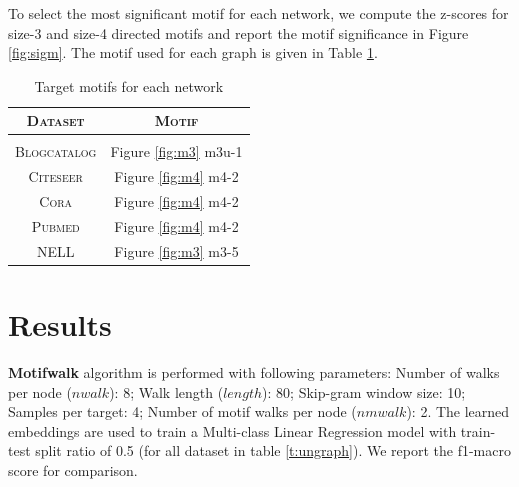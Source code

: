 \documentclass{article}
\theoremstyle{definition}
\begin{document}
\begin{table}
\centering
{}
\setlength{\belowcaptionskip}{-10pt}
\caption{Datasets for semi-supervised embeddings}
\label{t:segraph}
\end{table}
To select the most significant motif for each network, we compute the z-scores for
size-3 and size-4 directed motifs and report the motif significance
in Figure \ref{fig:sigm}. The motif used for each graph is given in Table
\ref{t:motifs}. 
\begin{table}
\centering
\begin{tabular}{c c}
\textsc{Dataset} & \textsc{Motif} \\
\hline \\
\textsc{Blogcatalog} & Figure \ref{fig:m3} m3u-1 \\
\textsc{Citeseer} & Figure \ref{fig:m4} m4-2 \\
\textsc{Cora} & Figure \ref{fig:m4} m4-2 \\
\textsc{Pubmed} & Figure \ref{fig:m4} m4-2 \\
\textsc{NELL} & Figure \ref{fig:m3} m3-5 \\
\end{tabular}%
\caption{Target motifs for each network}
\label{t:motifs}
\end{table}
\section{Results}
\textbf{Motifwalk} algorithm is performed with following parameters: Number of
walks per node ($nwalk$): 8; Walk length ($length$): 80; Skip-gram window size: 
10; Samples per target: 4;  Number of motif walks per node ($nmwalk$): 2. The
learned embeddings are used to train a Multi-class Linear Regression model with
train-test split ratio of 0.5 (for all dataset in table \ref{t:ungraph}). We report
the f1-macro score for comparison.
\end{document}
